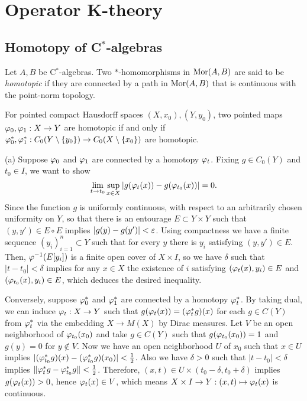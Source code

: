 \documentclass{../../large}
\begin{document}
\chapter{Operator K-theory}

\section{Homotopy of C$^*$-algebras}

\begin{prb}
Let $A,B$ be C$^*$-algebras.
Two $*$-homomorphisms in $\operatorname{Mor}(A,B)$ are said to be \emph{homotopic} if they are connected by a path in $\operatorname{Mor}(A,B)$ that is continuous with the point-norm topology.
\begin{parts}
\item For pointed compact Hausdorff spaces $(X,x_0),(Y,y_0)$, two pointed maps $\varphi_0,\varphi_1:X\to Y$ are homotopic if and only if $\varphi_0^*,\varphi_1^*:C_0(Y\setminus\{y_0\})\to C_0(X\setminus\{x_0\})$ are homotopic.
\end{parts}
\end{prb}
\begin{pf}
(a)
Suppose $\varphi_0$ and $\varphi_1$ are connected by a homotopy $\varphi_t$.
Fixing $g\in C_0(Y)$ and $t_0\in I$, we want to show
\[\lim_{t\to t_0}\sup_{x\in X}|g(\varphi_t(x))-g(\varphi_{t_0}(x))|=0.\]
Since the function $g$ is uniformly continuous, with respect to an arbitrarily chosen uniformity on $Y$, so that there is an entourage $E\subset Y\times Y$ such that $(y,y')\in E\circ E$ implies $|g(y)-g(y')|<\varepsilon$.
Using compactness we have a finite sequence $(y_i)_{i=1}^n\subset Y$ such that for every $y$ there is $y_i$ satisfying $(y,y')\in E$.
Then, $\varphi^{-1}(E[y_i])$ is a finite open cover of $X\times I$, so we have $\delta$ such that $|t-t_0|<\delta$ implies for any $x\in X$ the existence of $i$ satisfying $(\varphi_t(x),y_i)\in E$ and $(\varphi_{t_0}(x),y_i)\in E$, which deduces the desired inequality.

Conversely, suppose $\varphi_0^*$ and $\varphi_1^*$ are connected by a homotopy $\varphi_t^*$.
By taking dual, we can induce $\varphi_t:X\to Y$ such that $g(\varphi_t(x))=(\varphi_t^*g)(x)$ for each $g\in C(Y)$ from $\varphi_t^*$ via the embedding $X\to M(X)$ by Dirac measures.
Let $V$ be an open neighborhood of $\varphi_{t_0}(x_0)$ and take $g\in C(Y)$ such that $g(\varphi_{t_0}(x_0))=1$ and $g(y)=0$ for $y\notin V$.
Now we have an open neighborhood $U$ of $x_0$ such that $x\in U$ implies $|(\varphi_{t_0}^*g)(x)-(\varphi_{t_0}^*g)(x_0)|<\frac12$.
Also we have $\delta>0$ such that $|t-t_0|<\delta$ implies $\|\varphi_t^*g-\varphi_{t_0}^*g\|<\frac12$.
Therefore, $(x,t)\in U\times(t_0-\delta,t_0+\delta)$ implies $g(\varphi_t(x))>0$, hence $\varphi_t(x)\in V$, which means $X\times I\to Y:(x,t)\mapsto\varphi_t(x)$ is continuous.
\end{pf}
\end{document}
